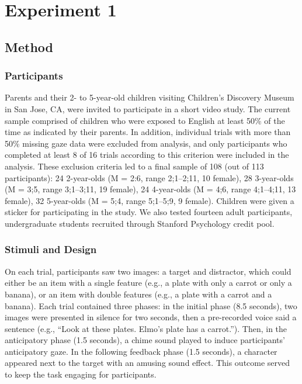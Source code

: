 \documentclass[10pt,letterpaper]{article}
\begin{document}
\section{Experiment 1}

\subsection{Method}

\subsubsection{Participants}

Parents and their 2- to 5-year-old children visiting Children's Discovery Museum in San Jose, CA, were invited to participate in a short video study. The current sample comprised of children who were exposed to English at least 50\% of the time as indicated by their parents. In addition, individual trials with more than 50\% missing gaze data were excluded from analysis, and only participants who completed at least 8 of 16 trials according to this criterion were included in the analysis. These exclusion criteria led to a final sample of 108 (out of 113 participants): 24 2-year-olds (M = 2:6, range 2;1--2;11, 10 female), 28 3-year-olds (M = 3;5, range 3;1--3;11, 19 female), 24 4-year-olds (M = 4;6, range 4;1--4;11, 13 female), 32 5-year-olds (M = 5;4, range 5;1--5;9, 9 female). Children were given a sticker for participating in the study. We also tested fourteen adult participants, undergraduate students recruited through Stanford Psychology credit pool.

\subsubsection{Stimuli and Design}

On each trial, participants saw two images: a target and distractor, which could either be an item with a single feature (e.g., a plate with only a carrot or only a banana), or an item with double features (e.g., a plate with a carrot and a banana). Each trial contained three phases: in the initial phase (8.5 seconds), two images were presented in silence for two seconds, then a pre-recorded voice said a sentence (e.g., ``Look at these plates. Elmo's plate has a carrot.''). Then, in the anticipatory phase (1.5 seconds), a chime sound played to induce participants' anticipatory gaze. In the following feedback phase (1.5 seconds), a character appeared next to the target with an amusing sound effect. This outcome served to keep the task engaging for participants.
\end{document}
